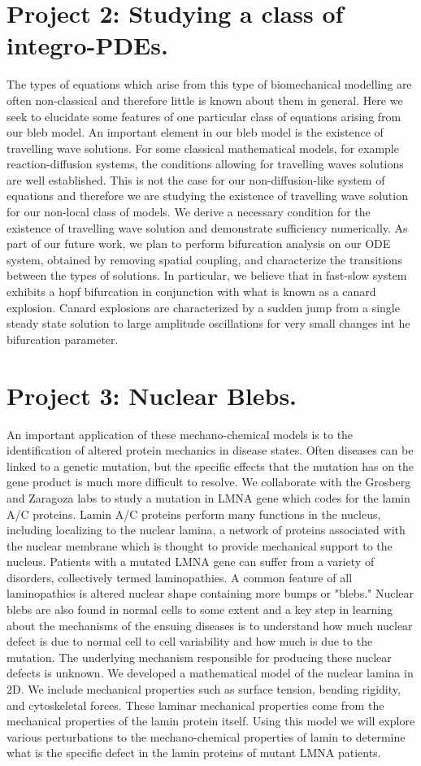 \documentclass[11pt]{amsart}
\begin{document}
\section*{Project 2: Studying a class of integro-PDEs.}
The types of equations which arise from this type of biomechanical modelling are often non-classical and therefore little is known about them in general. Here we seek to elucidate some features of one particular class of equations arising from our bleb model. An important element in our bleb model is the existence of travelling wave solutions. For some classical mathematical models, for example reaction-diffusion systems, the conditions allowing for travelling waves solutions are well established. This is not the case for our  non-diffusion-like system of equations and therefore we are studying the existence of travelling wave solution for our non-local class of models. We derive a necessary condition for the existence of travelling wave solution and demonstrate sufficiency numerically. As part of our future work, we plan to perform bifurcation analysis on our ODE system, obtained by removing spatial coupling, and characterize the transitions between the types of solutions. In particular, we believe that in fast-slow system exhibits a hopf bifurcation in conjunction with what is known as a canard explosion. Canard explosions are characterized by a sudden jump from a single steady state solution to large amplitude oscillations for very small changes int he bifurcation parameter. 

\section*{Project 3: Nuclear Blebs.}
An important application of these mechano-chemical models is to the identification of altered protein mechanics in disease states. Often diseases can be linked to a genetic mutation, but the specific effects that the mutation has on the gene product is much more difficult to resolve. We collaborate with the Grosberg and Zaragoza labs to study a mutation in LMNA gene which codes for the lamin A/C proteins. Lamin A/C proteins perform many functions in the nucleus, including localizing to the nuclear lamina, a network of proteins associated with the nuclear membrane which is thought to provide mechanical support to the nucleus. Patients with a mutated LMNA gene can suffer from a variety of disorders, collectively termed laminopathies. A common feature of all laminopathies is altered nuclear shape containing more bumps or "blebs." Nuclear blebs are also found in normal cells to some extent and a key step in learning about the mechanisms of the ensuing diseases is to understand how much nuclear defect is due to normal cell to cell variability and how much is due to the mutation. The underlying mechanism responsible for producing these nuclear defects is unknown. We developed a mathematical model of the nuclear lamina in 2D. We include mechanical properties such as surface tension, bending rigidity, and cytoskeletal forces. These laminar mechanical properties come from the mechanical properties of the lamin protein itself. Using this model we will explore various perturbations to the mechano-chemical properties of lamin to determine what is the specific defect in the lamin proteins of mutant LMNA patients.
\end{document}
